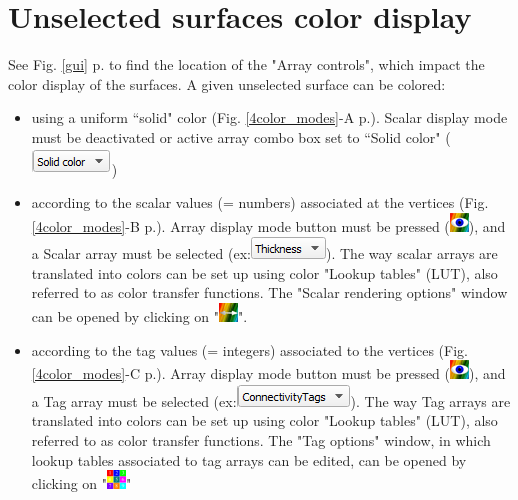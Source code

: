  \section{Unselected surfaces color display}
See Fig. \ref{gui} p.\pageref{gui} to find the location of the "Array controls", which impact the color display of the surfaces.
 A given unselected surface can be colored: 
\begin{itemize}
\item using a uniform ``solid" color (Fig. \ref{4color_modes}-A p.\pageref{4color_modes}). Scalar display mode must be deactivated or active array combo box set to ``Solid color" (\includegraphics[scale=0.5]{images/04/scalarcombo_solidcolor.png})
\item	according to the scalar values (= numbers) associated at the vertices (Fig. \ref{4color_modes}-B p.\pageref{4color_modes}). Array display mode button must be pressed (\includegraphics[scale=0.7]{images/04/show_color_scale.png}), and a Scalar array must be selected (ex:\includegraphics[scale=0.5]{images/04/scalarcombo_scalar.png}). The way scalar arrays are translated into colors can be set up using color "Lookup tables" (LUT), also referred to as color transfer functions. The "Scalar rendering options" window can be opened by clicking on "\includegraphics[scale=0.7]{images/04/color_scale_edit.png}". 
\item according to the tag values (= integers) associated to the vertices (Fig. \ref{4color_modes}-C p.\pageref{4color_modes}). Array display mode button must be pressed (\includegraphics[scale=0.7]{images/04/show_color_scale.png}), and a Tag array must be selected (ex:\includegraphics[scale=0.5]{images/04/scalarcombo_tag.png}). The way Tag arrays are translated into colors can be set up using color "Lookup tables" (LUT), also referred to as color transfer functions. The "Tag options" window, in which lookup tables associated to tag arrays can be edited, can be opened by clicking on "\includegraphics[scale=0.7]{images/04/tag_edit.png}"

\end{itemize}
